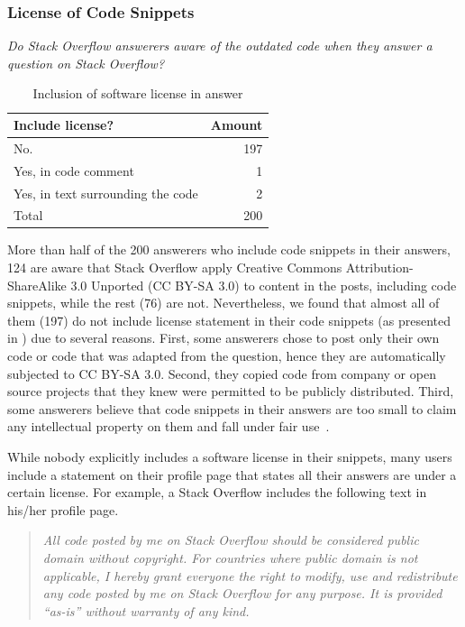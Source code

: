 \documentclass[10pt,journal,compsoc]{IEEEtran}
\begin{document}
\subsubsection{License of Code Snippets} 
\vspace{0.25cm}
\textit{Do Stack Overflow
	answerers aware of the outdated code when
	they answer a question on Stack Overflow?} 
\vspace{0.25cm}

\begin{table}
	\centering
	\caption{Inclusion of software license in answer}
	\label{tab:survey_license_include}
	\begin{tabular}{lr}
		\toprule
		Include license? & Amount \\
		\midrule
		No. & 197 \\
		Yes, in code comment &	1 \\
		Yes, in text surrounding the code & 2 \\
		\midrule
		Total & 200 \\
		\bottomrule
	\end{tabular}
\end{table}

More than half of the 200 answerers who include code snippets in their answers,
124 are aware that Stack Overflow apply Creative Commons Attribution-ShareAlike
3.0 Unported (CC BY-SA 3.0) to content in the posts, including code snippets,
while the rest (76) are not. Nevertheless, we found that almost all of them (197) do
not include license statement in their code snippets (as presented in
) due to several reasons. First, some answerers chose
to post only their own code or code that was adapted from the question, hence
they are automatically subjected to CC BY-SA 3.0. Second, they copied code from
company or open source projects that they knew were permitted to be publicly
distributed. Third, some answerers believe that code snippets in their answers
are too small to claim any intellectual property on them and fall under fair
use~\cite{fairuse}.

While nobody explicitly includes a software license in their snippets,
many users include a statement on their profile page that states all their
answers are under a certain license. For example, a Stack Overflow includes 
the following text in his/her profile page.

\begin{quotation}
\textit{All code posted by me on
	Stack Overflow should be considered public domain without copyright. For
	countries where public domain is not applicable, I hereby grant everyone the
	right to modify, use and redistribute any code posted by me on Stack Overflow
	for any purpose. It is provided ``as-is'' without warranty of any kind.}
\end{quotation}
\end{document}
